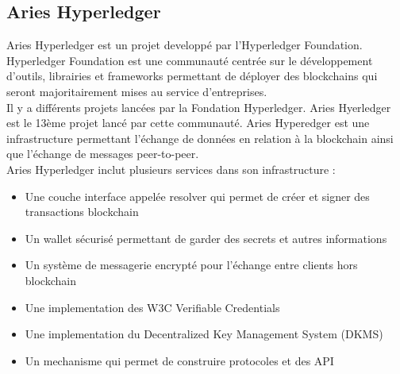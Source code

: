 \documentclass[12pt, openany]{report}
\begin{document}
\subsection{Aries Hyperledger}
\noindent 
\begin{flushleft}
Aries Hyperledger est un projet developpé par l'Hyperledger Foundation. Hyperledger Foundation est une communauté centrée sur le développement d'outils, librairies et frameworks permettant de déployer des blockchains qui seront majoritairement mises au service d'entreprises. \\
Il y a différents projets lancées par la Fondation Hyperledger. Aries Hyerledger est le 13ème projet lancé par cette communauté. Aries Hyperedger est une infrastructure permettant l'échange de données en relation à la blockchain ainsi que l'échange de messages peer-to-peer. \\
\vspace{2mm}
Aries Hyperledger inclut plusieurs services dans son infrastructure :
\begin{itemize}
\item Une couche interface appelée resolver qui permet de créer et signer des transactions blockchain
\item Un wallet sécurisé permettant de garder des secrets et autres informations 
\item Un système de messagerie encrypté pour l'échange entre clients hors blockchain
\item Une implementation des W3C Verifiable Credentials 
\item Une implementation du Decentralized Key Management System (DKMS)
\item Un mechanisme qui permet de construire protocoles et des API


\end{itemize}
\end{flushleft}
\end{document}
